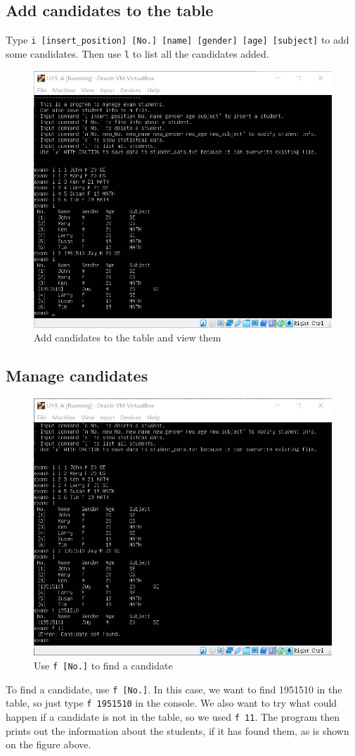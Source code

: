 \documentclass[cn,black,12pt,normal]{elegantnote}
\begin{document}
\subsection{Add candidates to the table}

Type \lstinline{i [insert_position] [No.] [name] [gender] [age] [subject]} to add some candidates. Then use \lstinline{l} to list all the candidates added.

\begin{figure}[H]
    \centering
    \includegraphics[width=0.7\linewidth]{image/exam_02.jpg}
    \caption{Add candidates to the table and view them}
\end{figure}

\subsection{Manage candidates}

\begin{figure}[H]
    \centering
    \includegraphics[width=0.7\linewidth]{image/exam_03.jpg}
    \caption{Use \lstinline{f [No.]} to find a candidate}
\end{figure}
To find a candidate, use \lstinline{f [No.]}. In this case, we want to find 1951510 in the table, so just type \lstinline{f 1951510} in the console. We also want to try what could happen if a candidate is not in the table, so we used \lstinline{f 11}. The program then prints out the information about the students, if it has found them, as is shown on the figure above.
\end{document}
